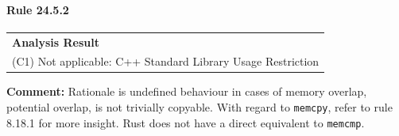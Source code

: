 \paragraph{Rule 24.5.2}
\begin{longtable}{p{13cm}}
\textbf{Analysis Result} \\
(C1) Not applicable: C++ Standard Library Usage Restriction \\
\end{longtable}
\textbf{Comment:} Rationale is undefined behaviour in cases of memory overlap, potential overlap, is not trivially copyable. With regard to \texttt{memcpy}, refer to rule 8.18.1 for more insight. Rust does not have a direct equivalent to \texttt{memcmp}. \\
